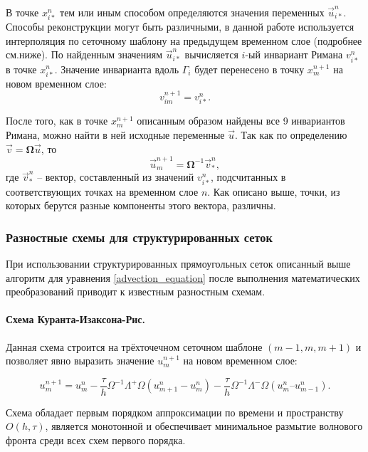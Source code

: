 В точке $x_{i*}^n$ тем или иным способом определяются значения переменных $\vec u_{i*}^n$. Способы реконструкции могут быть различными, в данной работе используется интерполяция по сеточному шаблону на предыдущем временном слое (подробнее см.ниже). По найденным значениям $\vec u_{i*}^n$ вычисляется $i$-ый инвариант Римана $v_{i*}^n$ в точке $x_{i*}^n$. Значение инварианта вдоль $\Gamma_i$ будет перенесено в точку $x_m^{n+1}$ на новом временном слое:
\begin{equation}
v_{im}^{n+1} = v_{i*}^n.
\end{equation}

После того, как в точке $x_m^{n+1}$ описанным образом найдены все 9 инвариантов Римана, можно найти в ней исходные переменные $\vec u$. Так как по определению ${\vec v}=\mathbf\Omega{\vec u}$, то
\begin{equation}
{\vec u}_m^{n+1}=\mathbf\Omega^{-1}{\vec v}_*^n,
\end{equation}
где ${\vec v}_*^n$ -- вектор, составленный из значений $v_{i*}^n$, подсчитанных в соответствующих точках на временном слое $n$. Как описано выше, точки, из которых берутся разные компоненты этого вектора, различны.


\subsubsection{Разностные схемы для структурированных сеток}

При использовании структурированных прямоугольных сеток описанный выше алгоритм для уравнения \ref{advection_equation} после выполнения математических преобразований приводит к известным разностным схемам.

\paragraph{Схема Куранта-Изаксона-Рис.} Данная схема строится на трёхточечном сеточном шаблоне $(m-1, m, m+1)$ и позволяет явно выразить значение $u_m^{n+1}$ на новом временном слое:

\begin{equation}
	\label{CIR scheme}
	u^{n+1}_m = u^n_m - \frac{\tau}{h} \Omega^{-1} \Lambda^+ \Omega (u^n_{m+1} - u^n_m) 
	- \frac{\tau}{h} \Omega^{-1} \Lambda^- \Omega (u^n_m – u^n_{m-1}) .
\end{equation}

Схема обладает первым порядком аппроксимации по времени и пространству $O(h, \tau)$, является монотонной и обеспечивает минимальное размытие волнового фронта среди всех схем первого порядка.

